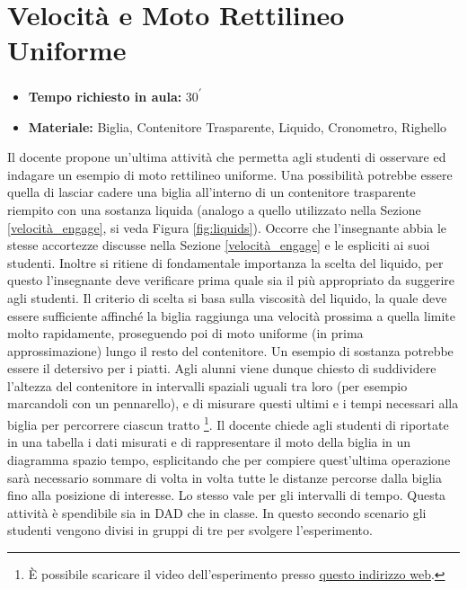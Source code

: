 \documentclass{report} \usepackage[T1]{fontenc} \usepackage[italian]{babel}
\begin{document}
\section{Velocità e Moto Rettilineo Uniforme}

\begin{itemize}
\item \textbf{Tempo richiesto in aula:} 30\textsuperscript{$\prime$}
\item \textbf{Materiale:} Biglia, Contenitore Trasparente, Liquido, Cronometro, Righello
\end{itemize}

Il docente propone un’ultima attività che permetta agli studenti di osservare
ed indagare un esempio di moto rettilineo uniforme. Una possibilità potrebbe
essere quella di lasciar cadere una biglia all’interno di un contenitore
trasparente riempito con una sostanza liquida (analogo a quello utilizzato
nella Sezione \ref{velocità_engage}, si veda Figura \ref{fig:liquids}).
Occorre che l’insegnante abbia
le stesse accortezze discusse nella Sezione \ref{velocità_engage} e
le espliciti ai suoi studenti. Inoltre si ritiene di fondamentale
importanza la scelta del liquido, per questo
l’insegnante deve verificare prima quale sia il più appropriato da suggerire
agli studenti. Il criterio di scelta si basa sulla viscosità del liquido, la
quale deve essere sufficiente affinché la biglia raggiunga una velocità
prossima a quella limite molto rapidamente, proseguendo poi di moto uniforme
(in prima approssimazione)
lungo il resto del contenitore. Un esempio di sostanza potrebbe essere il
detersivo per i piatti. Agli alunni viene dunque chiesto di suddividere l'altezza
del contenitore in intervalli spaziali uguali tra loro (per esempio marcandoli con
un pennarello), e di misurare questi ultimi e i tempi necessari
alla biglia per percorrere ciascun
tratto \footnote{\`E possibile scaricare il video dell'esperimento presso
          \textcolor{blue}{\href{https://github.com/savaroskij/PED1/blob/master/progetto_finale/media/video/biglia_detersivo.mp4?raw=true}{questo indirizzo web}}.
         }.
Il docente chiede agli studenti di riportate in una tabella i dati
misurati e di rappresentare il moto della biglia in un diagramma
spazio tempo, esplicitando che per compiere quest'ultima operazione
sarà necessario sommare di volta in volta tutte le distanze percorse
dalla biglia fino alla posizione di interesse. Lo stesso vale per
gli intervalli di tempo.
Questa attività è
spendibile sia in DAD che in classe. In questo secondo scenario gli studenti
vengono divisi in gruppi di tre per svolgere l’esperimento.
\end{document}
